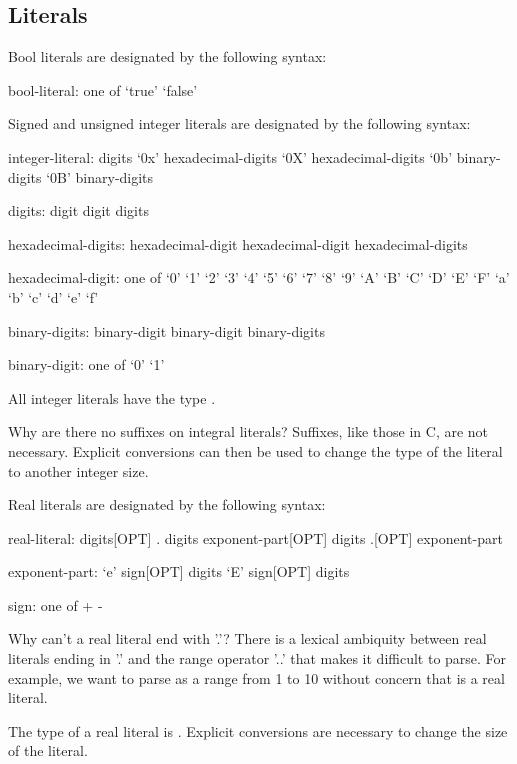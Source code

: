 \subsection{Literals}
\label{Literals}
\label{Primitive_Type_Literals}

Bool literals are designated by the following syntax:
\begin{syntax}
bool-literal: one of
  `true' `false'
\end{syntax}

Signed and unsigned integer literals are designated by the following
syntax:
\begin{syntax}
integer-literal:
  digits
  `0x' hexadecimal-digits
  `0X' hexadecimal-digits
  `0b' binary-digits
  `0B' binary-digits

digits:
  digit
  digit digits

hexadecimal-digits:
  hexadecimal-digit
  hexadecimal-digit hexadecimal-digits

hexadecimal-digit: one of
  `0' `1' `2' `3' `4' `5' `6' `7' `8' `9' `A' `B' `C' `D' `E' `F' `a' `b' `c' `d' `e' `f'

binary-digits:
  binary-digit
  binary-digit binary-digits

binary-digit: one of
  `0' `1'
\end{syntax}

All integer literals have the type .

\begin{rationale}
Why are there no suffixes on integral literals?  Suffixes, like those
in C, are not necessary.  Explicit
conversions can then be used to change the type of the literal to
another integer size.
\end{rationale}

Real literals are designated by the following syntax:
\begin{syntax}
real-literal:
  digits[OPT] . digits exponent-part[OPT]
  digits .[OPT] exponent-part

exponent-part:
  `e' sign[OPT] digits
  `E' sign[OPT] digits

sign: one of
  + -
\end{syntax}
\begin{rationale}
Why can't a real literal end with '.'?  There is a lexical ambiquity
between real literals ending in '.' and the range operator '..' that
makes it difficult to parse.  For example, we want to
parse  as a range from 1 to 10 without concern
that  is a real literal.
\end{rationale}
The type of a real literal is .  Explicit conversions are
necessary to change the size of the literal.

